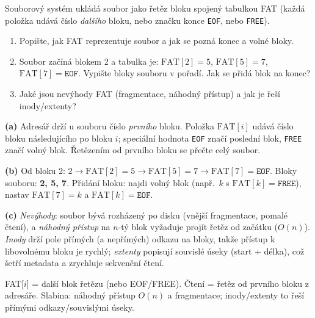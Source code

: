 \begin{zadani}
Souborový systém ukládá soubor jako řetěz bloku spojený tabulkou FAT (každá položka udává číslo \emph{dalšího} bloku, nebo značku konce \texttt{EOF}, nebo \texttt{FREE}).
\begin{enumerate}[label=(\alph*)]
  \item {} Popište, jak FAT reprezentuje soubor a jak se pozná konec a volné bloky.
  \item {} Soubor začíná blokem 2 a tabulka je: $\text{FAT}[2]{=}5$, $\text{FAT}[5]{=}7$, $\text{FAT}[7]{=}\texttt{EOF}$. Vypište bloky souboru v pořadí. Jak se přidá blok na konec?
  \item {} Jaké jsou nevýhody FAT (fragmentace, náhodný přístup) a jak je řeší inody/extenty?
\end{enumerate}
\end{zadani}

\begin{reseni}
\textbf{(a)} Adresář drží u souboru číslo \emph{prvního} bloku. Položka $\text{FAT}[i]$ udává číslo bloku následujícího po bloku $i$; speciální hodnota \texttt{EOF} značí poslední blok, \texttt{FREE} značí volný blok. Řetězením od prvního bloku se přečte celý soubor.

\textbf{(b)} Od bloku 2: $2\to\text{FAT}[2]{=}5\to\text{FAT}[5]{=}7\to\text{FAT}[7]{=}\texttt{EOF}$. Bloky souboru: \textbf{2, 5, 7}. Přidání bloku: najdi volný blok (např.\ $k$ s $\text{FAT}[k]{=}\texttt{FREE}$), nastav $\text{FAT}[7]{=}k$ a $\text{FAT}[k]{=}\texttt{EOF}$.

\textbf{(c)} \emph{Nevýhody}: soubor bývá rozházený po disku (vnější fragmentace, pomalé čtení), a \emph{náhodný přístup} na $n$-tý blok vyžaduje projít řetěz od začátku ($O(n)$). \emph{Inody} drží pole přímých (a nepřímých) odkazu na bloky, takže přístup k libovolnému bloku je rychlý; \emph{extenty} popisují souvislé úseky (start + délka), což šetří metadata a zrychluje sekvenční čtení.
\end{reseni}

\begin{jadro}
FAT[$i$] = další blok řetězu (nebo EOF/FREE). Čtení = řetěz od prvního bloku z adresáře. Slabina: náhodný přístup $O(n)$ a fragmentace; inody/extenty to řeší přímými odkazy/souvislými úseky.
\end{jadro}

